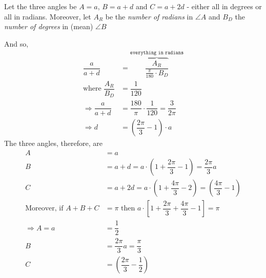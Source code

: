 \begin{solution}[\halfpage]
  \begin{fullwidth}
   Let the three angles be $A=a$, $B=a+d$ and $C=a+2d$ - either all in degrees or all in radians. 
   Moreover, let $A_R$ be the \textit{number of radians} in $\angle A$ and $B_D$ the
   \textit{number of degrees} in (mean) $\angle B$
   
   And so, 
   \begin{align}
       \dfrac{a}{a+d} &= \overbrace{\dfrac{A_R}{\frac{\pi}{180}\cdot B_D}}^{\texttt{everything in radians}} \\
       \text{where } \dfrac{A_R}{B_D} &= \dfrac{1}{120} \\
       \Rightarrow \dfrac{a}{a+d} &= \dfrac{180}{\pi}\cdot\dfrac{1}{120} = \dfrac{3}{2\pi} \\
       \Rightarrow d &= \left( \dfrac{2\pi}{3}-1\right)\cdot a 
   \end{align}
   The three angles, therefore, are 
   \begin{align}
      A &= a \\
      B &= a + d = a\cdot\left(1 + \dfrac{2\pi}{3} - 1 \right) = \dfrac{2\pi}{3}a\\
      C &= a + 2d = a\cdot\left( 1 + \dfrac{4\pi}{3} - 2\right) = \left( \dfrac{4\pi}{3} - 1\right) \\
      \text{Moreover, if } A + B + C &= \pi \text{ then } 
      a\cdot\left[1 + \dfrac{2\pi}{3} + \dfrac{4\pi}{3} - 1 \right] = \pi \\
      \Rightarrow A = a &= \dfrac{1}{2} \\
      B &= \dfrac{2\pi}{3}a = \dfrac{\pi}{3} \\
      C &= \left(\dfrac{2\pi}{3} - \dfrac{1}{2} \right)
   \end{align}
 \end{fullwidth}
\end{solution}
